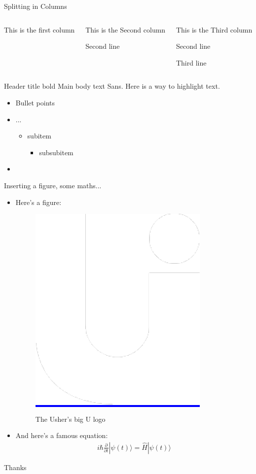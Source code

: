 \documentclass[notes]{beamer}
\begin{document}
\begin{frame}[fragile]{Splitting in Columns}
\begin{columns}
\begin{column}{0.3\textwidth}
	This is the first column\par
\end{column}
\begin{column}{0.4\textwidth}
	This is the Second column\par
	Second line\par
\end{column}
\begin{column}{0.3\textwidth}
	This is the Third column\par
	Second line\par
	Third line\par
\end{column}
\end{columns}
\end{frame}

\begin{frame}[t]{Header title bold}
	Main body text Sans. Here is a way to \alert{highlight text}.
	\label{sec:Test1}
	\begin{itemize}
		\item Bullet points
		\item ...
			\begin{itemize}
				\item subitem
					\begin{itemize}
						\item subsubitem
					\end{itemize}
			\end{itemize}
		\item \lipsum[2]
	\end{itemize}
\end{frame}



\begin{frame}{Inserting a figure, some maths...}
  \begin{itemize}
  \item   Here's a figure:
    \begin{figure}[h]
      \centering
      \colorbox{blue}{\includegraphics[width=.13\linewidth]{./assets/img/logo}}
      \caption{The Usher's big U logo}
      \label{fig:big-u}
    \end{figure}
  \item 
    And here's a famous equation:
  \begin{eqnarray}
    \label{eq:schroedinger}
    i\hbar {\frac {\partial }{\partial t}}|\psi (t)\rangle ={\hat {H}}|\psi (t)\rangle
  \end{eqnarray}
  \end{itemize}
\end{frame}

\begin{frame}
	\begin{center}
		{\fontsize{50}{60}\selectfont Thanks}
	\end{center}
\end{frame}
\end{document}
